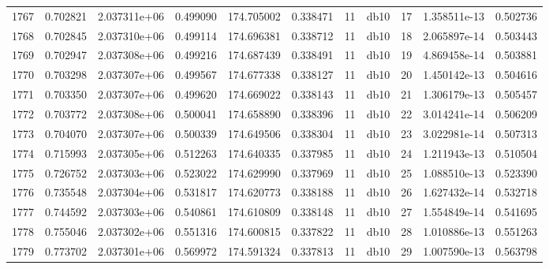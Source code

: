 \begin{tabular}{lrrrrrrlrrr}
1767 &    0.702821 &        2.037311e+06 &  0.499090 &              174.705002 &    0.338471 &      11 &         db10 &     17 &   1.358511e-13 &      0.502736 \\
1768 &    0.702845 &        2.037310e+06 &  0.499114 &              174.696381 &    0.338712 &      11 &         db10 &     18 &   2.065897e-14 &      0.503443 \\
1769 &    0.702947 &        2.037308e+06 &  0.499216 &              174.687439 &    0.338491 &      11 &         db10 &     19 &   4.869458e-14 &      0.503881 \\
1770 &    0.703298 &        2.037307e+06 &  0.499567 &              174.677338 &    0.338127 &      11 &         db10 &     20 &   1.450142e-13 &      0.504616 \\
1771 &    0.703350 &        2.037307e+06 &  0.499620 &              174.669022 &    0.338143 &      11 &         db10 &     21 &   1.306179e-13 &      0.505457 \\
1772 &    0.703772 &        2.037308e+06 &  0.500041 &              174.658890 &    0.338396 &      11 &         db10 &     22 &   3.014241e-14 &      0.506209 \\
1773 &    0.704070 &        2.037307e+06 &  0.500339 &              174.649506 &    0.338304 &      11 &         db10 &     23 &   3.022981e-14 &      0.507313 \\
1774 &    0.715993 &        2.037305e+06 &  0.512263 &              174.640335 &    0.337985 &      11 &         db10 &     24 &   1.211943e-13 &      0.510504 \\
1775 &    0.726752 &        2.037303e+06 &  0.523022 &              174.629990 &    0.337969 &      11 &         db10 &     25 &   1.088510e-13 &      0.523390 \\
1776 &    0.735548 &        2.037304e+06 &  0.531817 &              174.620773 &    0.338188 &      11 &         db10 &     26 &   1.627432e-14 &      0.532718 \\
1777 &    0.744592 &        2.037303e+06 &  0.540861 &              174.610809 &    0.338148 &      11 &         db10 &     27 &   1.554849e-14 &      0.541695 \\
1778 &    0.755046 &        2.037302e+06 &  0.551316 &              174.600815 &    0.337822 &      11 &         db10 &     28 &   1.010886e-13 &      0.551263 \\
1779 &    0.773702 &        2.037301e+06 &  0.569972 &              174.591324 &    0.337813 &      11 &         db10 &     29 &   1.007590e-13 &      0.563798 \\

\end{tabular}
